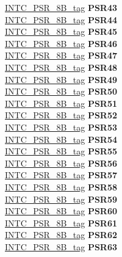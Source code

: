 \begin{DoxyCompactItemize}
\begin{tabbing}
\>\>\mbox{\hyperlink{unionINTC__PSR__8B__tag}{INTC\_PSR\_8B\_tag}} {\bfseries PSR43}\\
\>\>\mbox{\hyperlink{unionINTC__PSR__8B__tag}{INTC\_PSR\_8B\_tag}} {\bfseries PSR44}\\
\>\>\mbox{\hyperlink{unionINTC__PSR__8B__tag}{INTC\_PSR\_8B\_tag}} {\bfseries PSR45}\\
\>\>\mbox{\hyperlink{unionINTC__PSR__8B__tag}{INTC\_PSR\_8B\_tag}} {\bfseries PSR46}\\
\>\>\mbox{\hyperlink{unionINTC__PSR__8B__tag}{INTC\_PSR\_8B\_tag}} {\bfseries PSR47}\\
\>\>\mbox{\hyperlink{unionINTC__PSR__8B__tag}{INTC\_PSR\_8B\_tag}} {\bfseries PSR48}\\
\>\>\mbox{\hyperlink{unionINTC__PSR__8B__tag}{INTC\_PSR\_8B\_tag}} {\bfseries PSR49}\\
\>\>\mbox{\hyperlink{unionINTC__PSR__8B__tag}{INTC\_PSR\_8B\_tag}} {\bfseries PSR50}\\
\>\>\mbox{\hyperlink{unionINTC__PSR__8B__tag}{INTC\_PSR\_8B\_tag}} {\bfseries PSR51}\\
\>\>\mbox{\hyperlink{unionINTC__PSR__8B__tag}{INTC\_PSR\_8B\_tag}} {\bfseries PSR52}\\
\>\>\mbox{\hyperlink{unionINTC__PSR__8B__tag}{INTC\_PSR\_8B\_tag}} {\bfseries PSR53}\\
\>\>\mbox{\hyperlink{unionINTC__PSR__8B__tag}{INTC\_PSR\_8B\_tag}} {\bfseries PSR54}\\
\>\>\mbox{\hyperlink{unionINTC__PSR__8B__tag}{INTC\_PSR\_8B\_tag}} {\bfseries PSR55}\\
\>\>\mbox{\hyperlink{unionINTC__PSR__8B__tag}{INTC\_PSR\_8B\_tag}} {\bfseries PSR56}\\
\>\>\mbox{\hyperlink{unionINTC__PSR__8B__tag}{INTC\_PSR\_8B\_tag}} {\bfseries PSR57}\\
\>\>\mbox{\hyperlink{unionINTC__PSR__8B__tag}{INTC\_PSR\_8B\_tag}} {\bfseries PSR58}\\
\>\>\mbox{\hyperlink{unionINTC__PSR__8B__tag}{INTC\_PSR\_8B\_tag}} {\bfseries PSR59}\\
\>\>\mbox{\hyperlink{unionINTC__PSR__8B__tag}{INTC\_PSR\_8B\_tag}} {\bfseries PSR60}\\
\>\>\mbox{\hyperlink{unionINTC__PSR__8B__tag}{INTC\_PSR\_8B\_tag}} {\bfseries PSR61}\\
\>\>\mbox{\hyperlink{unionINTC__PSR__8B__tag}{INTC\_PSR\_8B\_tag}} {\bfseries PSR62}\\
\>\>\mbox{\hyperlink{unionINTC__PSR__8B__tag}{INTC\_PSR\_8B\_tag}} {\bfseries PSR63}\\

\end{tabbing}
\end{DoxyCompactItemize}
